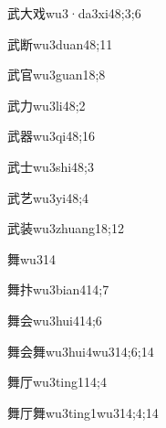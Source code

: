\begin{verbete}{武大戏}{wu3·da3xi4}{8;3;6}
\end{verbete}
\begin{verbete}{武断}{wu3duan4}{8;11}
\end{verbete}
\begin{verbete}{武官}{wu3guan1}{8;8}
\end{verbete}
\begin{verbete}{武力}{wu3li4}{8;2}
\end{verbete}
\begin{verbete}{武器}{wu3qi4}{8;16}
\end{verbete}
\begin{verbete}{武士}{wu3shi4}{8;3}
\end{verbete}
\begin{verbete}{武艺}{wu3yi4}{8;4}
\end{verbete}
\begin{verbete}{武装}{wu3zhuang1}{8;12}
\end{verbete}
\begin{verbete}{舞}{wu3}{14}
\end{verbete}
\begin{verbete}{舞抃}{wu3bian4}{14;7}
\end{verbete}
\begin{verbete}{舞会}{wu3hui4}{14;6}
\end{verbete}
\begin{verbete}{舞会舞}{wu3hui4wu3}{14;6;14}
\end{verbete}
\begin{verbete}{舞厅}{wu3ting1}{14;4}
\end{verbete}
\begin{verbete}{舞厅舞}{wu3ting1wu3}{14;4;14}
\end{verbete}

